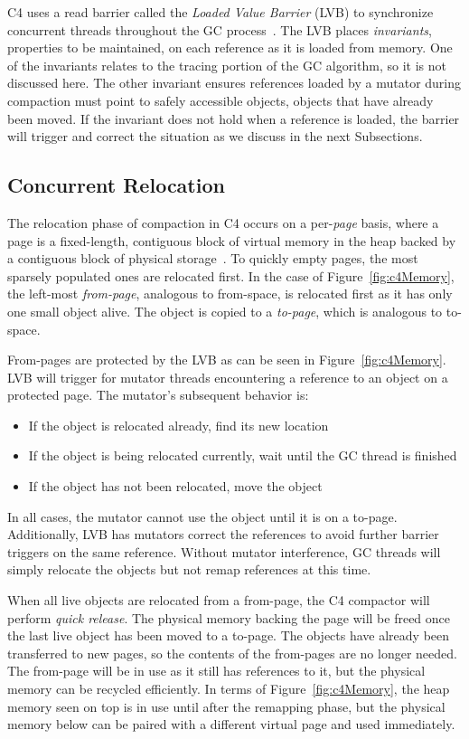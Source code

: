 \documentclass{sig-alternate}
\begin{document}
C4 uses a read barrier called the \emph{Loaded Value Barrier} (LVB) to 
synchronize concurrent threads throughout the GC process~\cite{Tene:C4}. The LVB 
places \emph{invariants}, properties to be maintained, on each reference as it is loaded from memory.
One of the invariants relates to the tracing portion of the GC algorithm, so
it is not discussed here. The other invariant ensures
references loaded by a mutator during compaction must point to safely
accessible objects, objects that have already been moved.
If the invariant does not hold
when a reference is loaded, the barrier will trigger and correct
the situation as we discuss in the next Subsections.


\subsection{Concurrent Relocation}
\label{sec:c4Relocation}

The relocation phase of compaction in C4 occurs on a per-\emph{page}
basis, where a page is a fixed-length, contiguous block of virtual memory in the heap
backed by a contiguous block of physical storage~\cite{Tene:C4}.
To quickly empty pages, the most sparsely populated ones are relocated
first. In the case of Figure~\ref{fig:c4Memory}, the left-most 
\emph{from-page}, analogous to from-space, is relocated first as it has only one small object alive.
The object is copied to a \emph{to-page}, which is analogous to to-space.

From-pages are protected by the LVB as can be seen in Figure~\ref{fig:c4Memory}. 
LVB will trigger for mutator threads encountering a reference to an object
on a protected page. The mutator's subsequent behavior is:
\begin{itemize}
\item If the object is relocated already, find its new location
\item If the object is being relocated currently, wait until the GC thread is finished
\item If the object has not been relocated, move the object 
\end{itemize}
In all cases, the mutator cannot use the object until it is on a to-page.
Additionally, LVB has mutators correct the
references to avoid further barrier triggers on the same
reference.
Without mutator interference, GC threads will simply relocate the objects but
not remap references at this time. 

When all live objects are relocated from a from-page,
the C4 compactor will perform \emph{quick release}. 
The physical memory backing the page will be freed
once the last live object has been moved to a to-page. The objects have already 
been transferred to new pages, so the contents of the from-pages are no longer needed. The from-page 
will be in use as it still has references to it, but the physical memory can be recycled efficiently. 
In terms of Figure~\ref{fig:c4Memory}, the heap
memory seen on top is in use until after the remapping phase, but the physical memory below 
can be paired with a different virtual page and used immediately.
\end{document}
